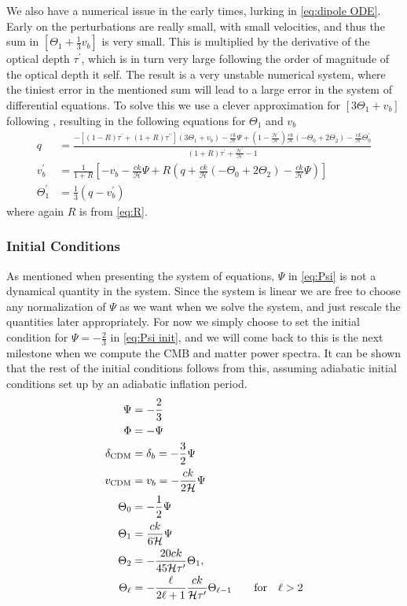 \documentclass[10pt,a4paper]{article}
\begin{document}
We also have a numerical issue in the early times, lurking in \cref{eq:dipole ODE}. Early on the perturbations are really small, with small velocities, and thus the sum in $\left[\Theta_1 + \frac{1}{3}v_b\right]$ is very small. This is multiplied by the derivative of the optical depth $\tau^\prime$, which is in turn very large following the order of magnitude of the optical depth it self. The result is a very unstable numerical system, where the tiniest error in the mentioned sum will lead to a large error in the system of differential equations. To solve this we use a clever approximation for $\left[3\Theta_1 + v_b\right]$ following \cite{Calin}, resulting in the following equations for $\Theta_1$ and $v_b$
\begin{align}
q &= \frac{-[(1-R)\tau^\prime + (1+R)\tau^{\prime\prime}](3\Theta_1+v_b) -
\frac{ck}{\mathcal{H}}\Psi + (1-\frac{\mathcal{H}^\prime}{\mathcal{H}})\frac{ck}{\mathcal{H}}(-\Theta_0 +
2\Theta_2) - \frac{ck}{\mathcal{H}}\Theta_0^\prime}{(1+R)\tau^\prime + \frac{\mathcal{H}^\prime}{\mathcal{H}} -
1}
\\
v_b^\prime &= \frac{1}{1+R} \left[-v_b - \frac{ck}{\mathcal{H}}\Psi + R(q +
\frac{ck}{\mathcal{H}}(-\Theta_0 + 2\Theta_2) - \frac{ck}{\mathcal{H}}\Psi)\right]
\\
\Theta^\prime_1 &= \frac{1}{3} (q - v_b^\prime)
\end{align}
where again $R$ is from \cref{eq:R}.

\subsubsection{Initial Conditions}
\label{subsubsec:Theory/Initial conditions}
As mentioned when presenting the system of equations, $\Psi$ in \cref{eq:Psi} is not a dynamical quantity in the system. Since the system is linear we are free to choose any normalization of $\Psi$ as we want when we solve the system, and just rescale the quantities later appropriately. For now we simply choose to set the initial condition for $\Psi = -\frac{2}{3}$ in \cref{eq:Psi init}, and we will come back to this is the next milestone when we compute the CMB and matter power spectra. It can be shown that the rest of the initial conditions follows from this, assuming adiabatic initial conditions set up by an adiabatic inflation period.
\begin{align}
\Psi &= -\frac{2}{3} \label{eq:Psi init}
\\
\Phi &= -\Psi
\\
\delta_{\rm CDM} &= \delta_b = -\frac{3}{2} \Psi 
\\
v_{\rm CDM} &= v_b = -\frac{ck}{2\mathcal{H}} \Psi
\\
\Theta_0 &= -\frac{1}{2} \Psi 
\\
\Theta_1 &= \frac{ck}{6\mathcal{H}}\Psi 
\\
\Theta_2 &= -\frac{20ck}{45\mathcal{H}\tau^\prime} \Theta_1,
\\
\Theta_\ell &= -\frac{\ell}{2\ell+1} \frac{ck}{\mathcal{H}\tau^\prime} \Theta_{\ell-1} \quad \qfor \ell > 2
\end{align}
\end{document}
